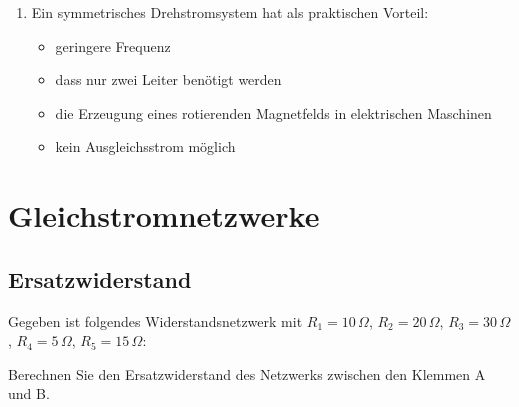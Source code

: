 \documentclass[a4paper,12pt]{article}
\newif\ifshowsolutions
\begin{document}
\begin{enumerate}[label=\textbf{\arabic*.}, leftmargin=*, itemsep=8pt]
\ifshowsolutions
Lösung: A
\fi

  \item Ein symmetrisches Drehstromsystem hat als praktischen Vorteil:
    \begin{itemize}[label=$\square$]
      \item[A)] geringere Frequenz
      \item[B)] dass nur zwei Leiter benötigt werden
      \item[C)] die Erzeugung eines rotierenden Magnetfelds in elektrischen Maschinen
      \item[D)] kein Ausgleichsstrom möglich
    \end{itemize}

\ifshowsolutions
Lösung: C
\fi

\end{enumerate}

\newpage

\section{Gleichstromnetzwerke}

\subsection{Ersatzwiderstand}

Gegeben ist folgendes Widerstandsnetzwerk mit $R_1 = 10\,\Omega$, $R_2 = 20\,\Omega$, $R_3 = 30\,\Omega$, $R_4 = 5\,\Omega$, $R_5 = 15\,\Omega$:

\begin{center}
\end{center}

Berechnen Sie den Ersatzwiderstand des Netzwerks zwischen den Klemmen A und B.

\ifshowsolutions
Lösung:
\[
R_{23} = R_2 + R_3 = 20 + 30 = 50\,\Omega
\]
\[
\frac{1}{R_{234}} = \frac{1}{R_{23}} + \frac{1}{R_4} = \frac{1}{50} + \frac{1}{5} = \frac{11}{50}\,\frac{1}{\Omega}
\]
\[
R = R_1 + R_{234} + R_5 = 10 + \frac{50}{11} + 15 = 29.55\,\Omega
\]
\fi
\end{document}
